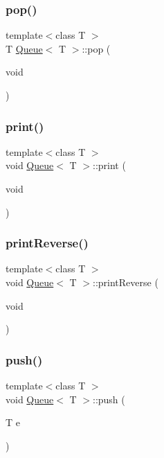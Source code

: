 \mbox{\label{class_queue_a2398b345833a6953f46d9103a987f86c}} 
\subsubsection{\texorpdfstring{pop()}{pop()}}
{\footnotesize\ttfamily template$<$class T $>$ \\
T \hyperlink{class_queue}{Queue}$<$ T $>$\+::pop (\begin{DoxyParamCaption}\item[{void}]{ }\end{DoxyParamCaption})}

\mbox{\label{class_queue_a7a7d0ab94a0123eab32ee1ad4f85cf2b}} 
\subsubsection{\texorpdfstring{print()}{print()}}
{\footnotesize\ttfamily template$<$class T $>$ \\
void \hyperlink{class_queue}{Queue}$<$ T $>$\+::print (\begin{DoxyParamCaption}\item[{void}]{ }\end{DoxyParamCaption})}

\mbox{\label{class_queue_a79283a677e816b81b690d39dc4b648a1}} 
\subsubsection{\texorpdfstring{print\+Reverse()}{printReverse()}}
{\footnotesize\ttfamily template$<$class T $>$ \\
void \hyperlink{class_queue}{Queue}$<$ T $>$\+::print\+Reverse (\begin{DoxyParamCaption}\item[{void}]{ }\end{DoxyParamCaption})}

\mbox{\label{class_queue_a87fb1068ba6e87e3be225cfbd3c4778f}} 
\subsubsection{\texorpdfstring{push()}{push()}}
{\footnotesize\ttfamily template$<$class T $>$ \\
void \hyperlink{class_queue}{Queue}$<$ T $>$\+::push (\begin{DoxyParamCaption}\item[{T}]{e }\end{DoxyParamCaption})}


